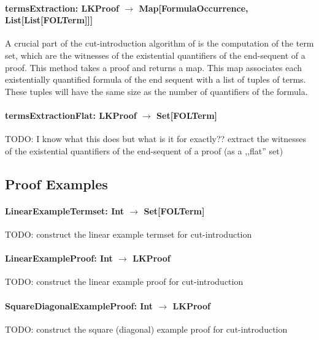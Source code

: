 \documentclass[a4paper, 11pt]{report}
\begin{document}
\paragraph{\textbf{termsExtraction: LKProof $\rightarrow$ Map[FormulaOccurrence, List[List[FOLTerm]]]}}
A crucial part of the cut-introduction algorithm of \cite{Hetzl2012} is the
computation of the term set, which are the witnesses of the existential
quantifiers of the end-sequent of a proof. This method takes a proof and returns
a map. This map associates each existentially quantified formula of the end
sequent with a list of tuples of terms. These tuples will have the same size as
the number of quantifiers of the formula.

\paragraph{\textbf{termsExtractionFlat: LKProof $\rightarrow$ Set[FOLTerm]}}
{\color{red}TODO: I know what this does but what is it for exactly??} extract
the witnesses of the existential quantifiers of the end-sequent of a proof (as a
,,flat'' set)

\subsection{Proof Examples}
\label{sec:exampleproofs}


\paragraph{\textbf{LinearExampleTermset: Int $\rightarrow$ Set[FOLTerm]}}
{\color{red}TODO}: construct the linear example termset for cut-introduction

\paragraph{\textbf{LinearExampleProof: Int $\rightarrow$ LKProof}}
{\color{red}TODO}: construct the linear example proof for cut-introduction

\paragraph{\textbf{SquareDiagonalExampleProof: Int $\rightarrow$ LKProof}}
{\color{red}TODO}: construct the square (diagonal) example proof for cut-introduction
\end{document}
